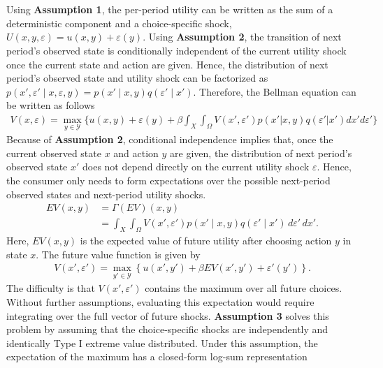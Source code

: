 \\
\\ 
Using \textbf{Assumption 1}, the per-period utility can be written as the sum of a deterministic component and a choice-specific shock, $U(x,y,\varepsilon) = u(x,y) + \varepsilon(y).$
Using\textbf{ Assumption 2}, the transition of next period's observed state is conditionally independent of the current utility shock once the current state and action are given. Hence, the distribution of next period's observed state and utility shock can be factorized as $p(x',\varepsilon' \mid x,\varepsilon,y) = p(x' \mid x,y)q(\varepsilon' \mid x')$. Therefore, the Bellman equation can be written as follows
\begin{align*}
     V(x,\varepsilon) = \max_{y \in \mathcal{Y}} \{u(x,y) + \varepsilon(y) + \beta \int_X \int_{\Omega} V(x',\varepsilon')p(x' \vert x,y)q(\varepsilon' \vert x')dx'd\varepsilon'\}
\end{align*} 
Because of \textbf{Assumption 2}, conditional independence implies that, once the current observed state $x$ and action $y$ are given, the distribution of next period's observed state $x'$ does not depend directly on the current utility shock $\varepsilon$. Hence, the consumer only needs to form expectations over the possible next-period observed states and next-period utility shocks.\\
\vspace{-1cm}
\begin{align*}
    EV(x,y) 
    &= \Gamma(EV)(x,y) \\
    &= \int_{X} \int_{\Omega} 
    V(x',\varepsilon')
    p(x' \mid x,y)
    q(\varepsilon' \mid x')
    \, d\varepsilon' \, dx' .
\end{align*} 
Here, \(EV(x,y)\) is the expected value of future utility after choosing action \(y\) in state \(x\). The future value function is given by
\begin{align*}
    V(x',\varepsilon') 
    =
    \max_{y' \in \mathcal{Y}}
    \left\{
    u(x',y') + \beta EV(x',y') + \varepsilon'(y')
    \right\}.
\end{align*}
\noindent
The difficulty is that $V(x',\varepsilon')$ contains the maximum over all future choices. Without further assumptions, evaluating this expectation would require integrating over the full vector of future shocks. \textbf{Assumption 3} solves this problem by assuming that the choice-specific shocks are independently and identically Type I extreme value distributed. Under this assumption, the expectation of the maximum has a closed-form log-sum representation
